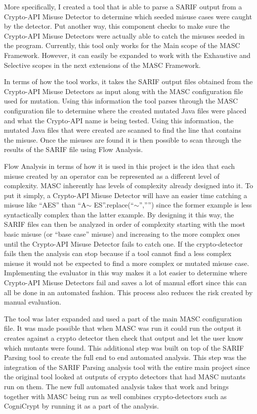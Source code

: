More specifically, I created a tool that is able to parse a SARIF output from a Crypto-API Misuse Detector to determine which seeded misuse cases were caught by the detector.  Put another way, this component checks to make sure the Crypto-API Misuse Detectors were actually able to catch the misuses seeded in the program. Currently, this tool only works for the Main scope of the MASC Framework.  However, it can easily be expanded to work with the Exhaustive and Selective scopes in the next extensions of the MASC Framework. 
    
In terms of how the tool works, it takes the SARIF output files obtained from the Crypto-API Misuse Detectors as input along with the MASC configuration file used for mutation. Using this information the tool parses through the MASC configuration file to determine where the created mutated Java files were placed and what the Crypto-API name is being tested.  Using this information, the mutated Java files that were created are scanned to find the line that contains the misuse.  Once the misuses are found it is then possible to scan through the results of the SARIF file using Flow Analysis.

Flow Analysis in terms of how it is used in this project is the idea that each misuse created by an operator can be represented as a different level of complexity.  MASC inherently has levels of complexity already designed into it. To put it simply, a Crypto-API Misuse Detector will have an easier time catching a misuse like “AES” than “A$\sim$ ES”.replace(“$\sim$”,””) since the former example is less syntactically complex than the latter example. By designing it this way, the SARIF files can then be analyzed in order of complexity starting with the most basic misuse (or “base case” misuse) and increasing to the more complex ones until the Crypto-API Misuse Detector fails to catch one. If the crypto-detector fails then the analysis can stop because if a tool cannot find a less complex misuse it would not be expected to find a more complex or mutated misuse case.  Implementing the evaluator in this way makes it a lot easier to determine where Crypto-API Misuse Detectors fail and saves a lot of manual effort since this can all be done in an automated fashion.  This process also reduces the risk created by manual evaluation. 

The tool was later expanded and used a part of the main MASC configuration file. It was made possible that when MASC was run it could run the output it creates against a crypto detector then check that output and let the user know which mutants were found. This additional step was built on top of the SARIF Parsing tool to create the full end to end automated analysis. This step was the integration of the SARIF Parsing analysis tool with the entire main project since the original tool looked at outputs of crypto detectors that had MASC mutants run on them. The new full automated analysis takes that work and brings together with MASC being run as well combines crypto-detectors such as CogniCrypt by running it as a part of the analysis.

